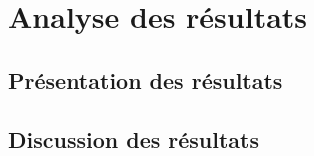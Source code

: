 \chapter{Analyse des résultats}




\section{Présentation des résultats}




\section{Discussion des résultats}

